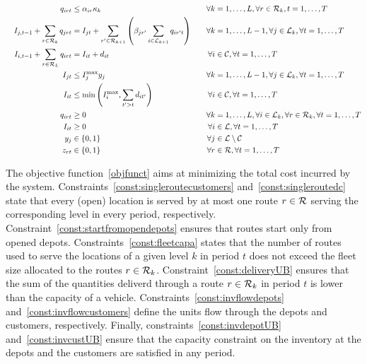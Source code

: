 \documentclass[a4paper,10pt]{article}
\begin{document}
\begin{linenumbers}
\begin{alignat}{3}
    &&q_{irt}   		&\leq \alpha_{ir}\kappa_k  														&\forall k&=1,\ldots,L, \forall r\in \mathcal{R}_k, t=1,\ldots,T\label{const:deliveryConstLoc}\\
    &&I_{j,t-1} + \sum_{r\in\mathcal{R}_k} q_{jrt}   			&=I_{jt} +\sum_{r'\in \mathcal{R}_{k+1}}\left(\beta_{jr'} \sum_{i\in \mathcal{L}_{k+1}}q_{ir't}\right)\quad 			&\forall k&=1,\ldots,L-1, \forall j\in \mathcal{L}_k, \forall t=1,\ldots,T \label{const:invflowdepots}\\
    &&I_{i,t-1}+\sum_{r\in \mathcal{R}_L} q_{irt} &= I_{it} +d_{it} 							&\forall i&\in \mathcal{C}, \forall t=1,\ldots,T\label{const:invflowcustomers}\\
    &&I_{jt}					&\leq I_j^{\max} y_j  									&\forall k&=1,\ldots,L-1, \forall j\in \mathcal{L}_k,\forall t=1,\ldots,T\label{const:invdepotUB}\\	
    &&I_{it} 					&\leq \min\left(I_i^{\max}, \sum_{t' > t}d_{it'}\right)											&\forall i&\in \mathcal{C}, \forall t=1,\ldots,T\label{const:invcustUB}\\
    &&q_{irt}			&\geq 0 															&\forall k&=1,\ldots,L, \forall i\in \mathcal{L}_k, \forall r\in \mathcal{R}_k,\forall t=1,\ldots, T\label{const:upos}	\\
    &&I_{it}			&\geq 0 															&\forall i &\in \mathcal{L}, \forall t=1,\ldots, T\label{const:invCpos}	\\
    &&y_{j}					& \in \{0,1\} 														&\forall j&\in \mathcal{L}\setminus\mathcal{C}\label{const:ybool}\\	
    &&z_{rt}					&\in \{0,1\} 														&\forall r&\in \mathcal{R}, \forall t=1,\ldots,T\label{const:zbool}
\end{alignat}

The objective function~\eqref{objfunct} aims at minimizing the total cost incurred by the system. 
Constraints~\eqref{const:singleroutecustomers} and~\eqref{const:singleroutedc} state that every (open) location is served by at most one route $r\in\mathcal{R}$ serving the corresponding level in every period, respectively. 
Constraint~\eqref{const:startfromopendepots} ensures that routes start only from opened depots. 
Constraints~\eqref{const:fleetcapa} states that the number of routes used to serve the locations of a given level $k$ in period $t$ does not exceed the fleet size allocated to the routes $r\in\mathcal{R}_k$.
Constraint~\eqref{const:deliveryUB} ensures that the sum of the quantities deliverd through a route $r\in\mathcal{R}_k$ in period $t$ is lower than the capacity of a vehicle. 
Constraints~\eqref{const:invflowdepots} and~\eqref{const:invflowcustomers} define the units flow through the depots and customers, respectively.
Finally, constraints~\eqref{const:invdepotUB} and~\eqref{const:invcustUB} ensure that the capacity constraint on the inventory at the depots and the customers are satisfied in any period. 


\end{linenumbers}
\end{document}
